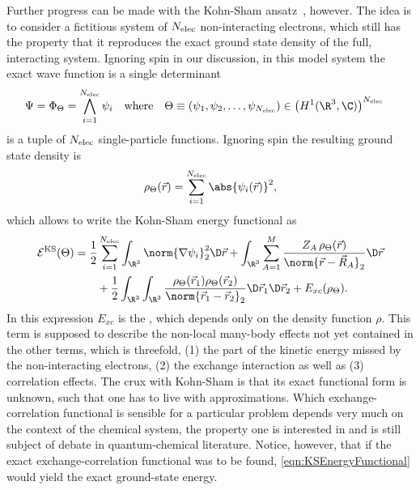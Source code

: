 Further progress can be made with the Kohn-Sham ansatz~\cite{Kohn1965}, however.
The idea is to consider a fictitious system of
$N_\text{elec}$ non-interacting electrons,
which still has the property that it reproduces the exact
ground state density of the full, interacting system.
Ignoring spin in our discussion,
in this model system the exact wave function is a single determinant
\begin{align*}
	\Psi &= \Phi_\Theta = \bigwedge_{i=1}^{\Nelec} \psi_i
	&&\text{where}&
	\Theta \equiv \left(\psi_1, \psi_2, \ldots, \psi_{\Nelec}\right)
	&\in \left(H^1(\R^3, \C)\right)^{\Nelec}
\end{align*}
is a tuple of $N_\text{elec}$ single-particle functions.
Ignoring spin the resulting ground state density is
\[
	\rho_\Theta(\vec{r}) = \sum_{i=1}^{\Nelec} \abs{\psi_i(\vec{r})}^2,
\]
which allows to write the Kohn-Sham energy functional as
\begin{equation}
	\begin{aligned}
	\mathcal{E}^\text{KS}(\Theta)
	&= \frac12 \sum_{i=1}^{\Nelec} \int_{\R^3} \norm{\nabla \psi_i}_2^2 \D\vec{r}
	+ \int_{\R^3} \sum_{A=1}^M
		\frac{Z_A \, \rho_\Theta(\vec{r})}{\norm{\vec{r} - \vec{R}_A}_2} \D\vec{r} \\
	&\hspace{20pt}
	+ \frac12 \int_{\R^3}\int_{\R^3}
		\frac{\rho_\Theta(\vec{r}_1) \rho_\Theta(\vec{r}_2)}
			{\norm{\vec{r}_1 - \vec{r}_2}_2} \D\vec{r}_1 \D\vec{r}_2
	+ E_{xc}(\rho_\Theta).
	\end{aligned}
	\label{eqn:KSEnergyFunctional}
\end{equation}
In this expression $E_{xc}$ is the ,
which depends only on the density function $\rho$.
This term is supposed to describe the non-local
many-body effects not yet contained in the other terms,
which is threefold,
(1) the part of the kinetic energy missed by the non-interacting electrons,
(2) the exchange interaction as well as (3) correlation effects.
The crux with Kohn-Sham \DFT is that its exact functional form is unknown,
such that one has to live with approximations.
Which exchange-correlation functional is sensible for a particular
problem depends very much on the context of the chemical system,
the property one is interested in and is still subject of debate
in quantum-chemical literature.
Notice, however, that if the exact exchange-correlation functional was to be found,
\eqref{eqn:KSEnergyFunctional} would yield the exact ground-state energy.

